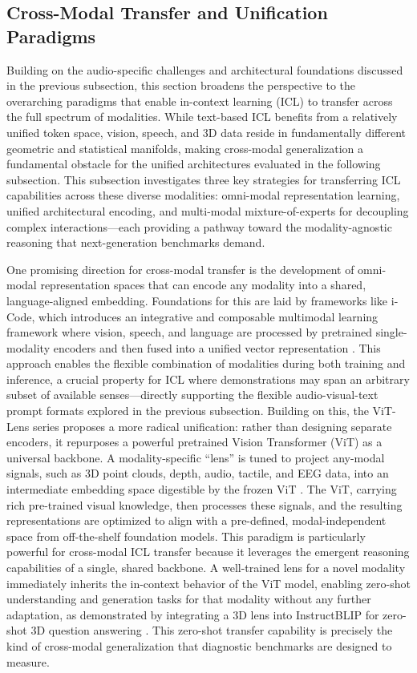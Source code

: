 \documentclass[11pt]{article}
\begin{document}
\subsection{Cross-Modal Transfer and Unification Paradigms}

Building on the audio-specific challenges and architectural foundations discussed in the previous subsection, this section broadens the perspective to the overarching paradigms that enable in-context learning (ICL) to transfer across the full spectrum of modalities. While text-based ICL benefits from a relatively unified token space, vision, speech, and 3D data reside in fundamentally different geometric and statistical manifolds, making cross-modal generalization a fundamental obstacle for the unified architectures evaluated in the following subsection. This subsection investigates three key strategies for transferring ICL capabilities across these diverse modalities: omni-modal representation learning, unified architectural encoding, and multi-modal mixture-of-experts for decoupling complex interactions---each providing a pathway toward the modality-agnostic reasoning that next-generation benchmarks demand.

One promising direction for cross-modal transfer is the development of omni-modal representation spaces that can encode any modality into a shared, language-aligned embedding. Foundations for this are laid by frameworks like i-Code, which introduces an integrative and composable multimodal learning framework where vision, speech, and language are processed by pretrained single-modality encoders and then fused into a unified vector representation \cite{ref283}. This approach enables the flexible combination of modalities during both training and inference, a crucial property for ICL where demonstrations may span an arbitrary subset of available senses---directly supporting the flexible audio-visual-text prompt formats explored in the previous subsection. Building on this, the ViT-Lens series proposes a more radical unification: rather than designing separate encoders, it repurposes a powerful pretrained Vision Transformer (ViT) as a universal backbone. A modality-specific ``lens'' is tuned to project any-modal signals, such as 3D point clouds, depth, audio, tactile, and EEG data, into an intermediate embedding space digestible by the frozen ViT \cite{ref292}. The ViT, carrying rich pre-trained visual knowledge, then processes these signals, and the resulting representations are optimized to align with a pre-defined, modal-independent space from off-the-shelf foundation models. This paradigm is particularly powerful for cross-modal ICL transfer because it leverages the emergent reasoning capabilities of a single, shared backbone. A well-trained lens for a novel modality immediately inherits the in-context behavior of the ViT model, enabling zero-shot understanding and generation tasks for that modality without any further adaptation, as demonstrated by integrating a 3D lens into InstructBLIP for zero-shot 3D question answering \cite{ref258}. This zero-shot transfer capability is precisely the kind of cross-modal generalization that diagnostic benchmarks are designed to measure.
\end{document}
